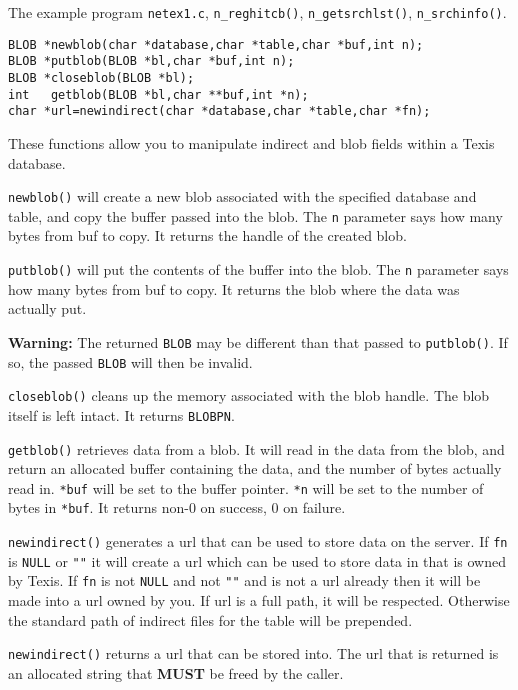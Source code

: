 \SEE
The example program \verb`netex1.c`, \verb`n_reghitcb()`,
\verb`n_getsrchlst()`, \verb`n_srchinfo()`.


\SYNOPSIS
\begin{verbatim}
BLOB *newblob(char *database,char *table,char *buf,int n);
BLOB *putblob(BLOB *bl,char *buf,int n);
BLOB *closeblob(BLOB *bl);
int   getblob(BLOB *bl,char **buf,int *n);
char *url=newindirect(char *database,char *table,char *fn);
\end{verbatim}

\DESCRIPTION
These functions allow you to manipulate indirect and blob fields within
a Texis database.

\verb`newblob()` will create a new blob associated with the specified
database and table, and copy the buffer passed into the blob.  The
\verb`n` parameter says how many bytes from buf to copy.  It returns the
handle of the created blob.

\verb`putblob()` will put the contents of the buffer into the blob.  The
\verb`n` parameter says how many bytes from buf to copy.  It returns the
blob where the data was actually put.

{\bf Warning:} The returned \verb`BLOB` may be different than that
passed to \verb`putblob()`.  If so, the passed \verb`BLOB` will then be
invalid.

\verb`closeblob()` cleans up the memory associated with the blob handle.
The blob itself is left intact.  It returns \verb`BLOBPN`.

\verb`getblob()` retrieves data from a blob.  It will read in the data
from the blob, and return an allocated buffer containing the data, and
the number of bytes actually read in.  \verb`*buf` will be set to the
buffer pointer.  \verb`*n` will be set to the number of bytes in
\verb`*buf`.  It returns non-0 on success, 0 on failure.

\verb`newindirect()` generates a url that can be used to store data on
the server.  If \verb`fn` is \verb`NULL` or \verb`""` it will create a
url which can be used to store data in that is owned by Texis.  If
\verb`fn` is not \verb`NULL` and not \verb`""` and is not a url already
then it will be made into a url owned by you.  If url is a full path, it
will be respected.  Otherwise the standard path of indirect files for
the table will be prepended.

\verb`newindirect()` returns a url that can be stored into.  The url
that is returned is an allocated string that {\bf MUST} be freed by the
caller.

